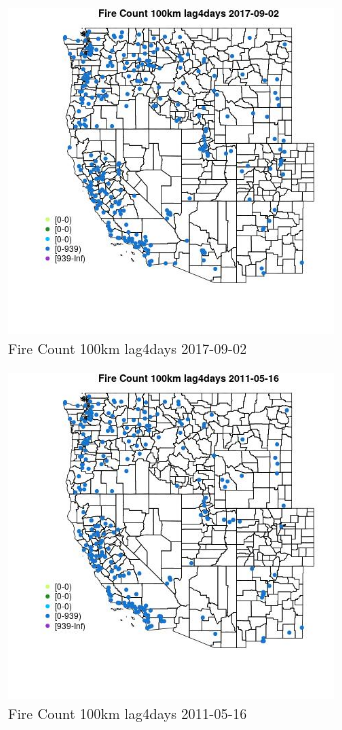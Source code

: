 \begin{figure} 
\centering  
\includegraphics[width=0.77\textwidth]{Code_Outputs/Report_ML_input_PM25_Step4_part_e_de_duplicated_aves_compiled_2019-05-21wNAs_MapObsFire_Count_100km_lag4days2017-09-02.jpg} 
\caption{\label{fig:Report_ML_input_PM25_Step4_part_e_de_duplicated_aves_compiled_2019-05-21wNAsMapObsFire_Count_100km_lag4days2017-09-02}Fire Count 100km lag4days 2017-09-02} 
\end{figure} 
 

\begin{figure} 
\centering  
\includegraphics[width=0.77\textwidth]{Code_Outputs/Report_ML_input_PM25_Step4_part_e_de_duplicated_aves_compiled_2019-05-21wNAs_MapObsFire_Count_100km_lag4days2011-05-16.jpg} 
\caption{\label{fig:Report_ML_input_PM25_Step4_part_e_de_duplicated_aves_compiled_2019-05-21wNAsMapObsFire_Count_100km_lag4days2011-05-16}Fire Count 100km lag4days 2011-05-16} 
\end{figure} 
 


